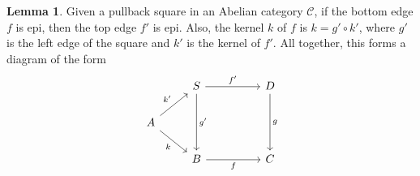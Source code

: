 \documentclass[aps,pra,showpacs,notitlepage,onecolumn,superscriptaddress,nofootinbib]{revtex4-1}
\theoremstyle{definition}
\newtheorem{lemma}{Lemma}[section]
\begin{document}
\begin{lemma}
  Given a pullback square in an Abelian category $\mathcal{C}$, if the bottom edge $f$ is epi, then the top edge $f'$ is epi. Also, the kernel $k$ of $f$ is $k = g' \circ k'$,
  where $g'$ is the left edge of the square and $k'$ is the kernel of $f'$. All together, this forms a diagram of the form
  \[\begin{tikzcd}
	& S && D \\
	A \\
	& B && C
	\arrow["{f'}", from=1-2, to=1-4]
	\arrow["{g'}", from=1-2, to=3-2]
	\arrow["g", from=1-4, to=3-4]
	\arrow["{k'}", from=2-1, to=1-2]
	\arrow["k"', from=2-1, to=3-2]
	\arrow["f"', from=3-2, to=3-4]
  \end{tikzcd}\]
  \end{lemma}
\end{document}
